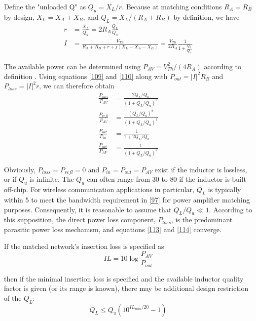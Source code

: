 Define the "unloaded Q" as $Q_u = X_L/r$. Because at matching conditions $R_A = R_B$ by design, $X_L = X_A + X_B$, and $Q_L = X_L/(R_A + R_B)$ by definition, we have
\begin{align}
    r&=\frac{X_L}{Q_u}=2R_A\frac{Q_L}{Q_u}\label{109}\\
    I&=\frac{V_{Th}}{R_A+R_B+r+j\left(X_L-X_A-X_B\right)}=\frac{V_{Th}}{2R_A}\frac{1}{1+\frac{Q_L}{Q_u}}\label{110}
\end{align}

The available power can be determined using $P_{AV} = V_{Th}^2/(4R_A)$ according to definition \cite{microwave-transistor-amplifier}. Using equations \eqref{109} and \eqref{110} along with $P_{out} = |I|^2R_B$ and $P_{loss} = |I|^2r$, we can therefore obtain
\begin{align}
    \frac{P_{loss}}{P_{AV}}&=\frac{2Q_L/Q_u}{\left(1+Q_L/Q_u\right)^2}\label{111}\\
    \frac{P_{refl}}{P_{AV}}&=\frac{\left(Q_L/Q_u\right)^2}{\left(1+Q_L/Q_u\right)^2}\label{112}\\
    \frac{P_{out}}{P_{in}}&=\frac{1}{1+2Q_L/Q_u}\label{113}\\
    \frac{P_{out}}{P_{AV}}&=\frac{1}{\left(1+Q_L/Q_u\right)^2}\label{114}
\end{align}

Obviously, $P_{loss} = P_{refl} = 0$ and $P_{in} = P_{out} = P_{AV}$ exist if the inductor is lossless, or if $Q_u$ is infinite. The $Q_u$ can often range from 30 to 80 if the inductor is built off-chip.
For wireless communication applications in particular, $Q_L$ is typically within 5 to meet the bandwidth requirement in \eqref{97} for power amplifier matching purposes. Consequently, it is reasonable to assume that $Q_L/Q_u\ll 1$.
According to this supposition, the direct power loss component, $P_{loss}$, is the predominant parasitic power loss mechanism, and equations \eqref{113} and \eqref{114} converge.

If the matched network's insertion loss is specified as
\begin{equation}
    IL=10\log\frac{P_{AV}}{P_{out}}
\end{equation}

then if the minimal insertion loss is specified and the available inductor quality factor is given (or its range is known), there may be additional design restriction of the $Q_L$:
\begin{equation}
    Q_L\leq Q_u\left(10^{IL_{min}/20}-1\right)\label{116}
\end{equation}

